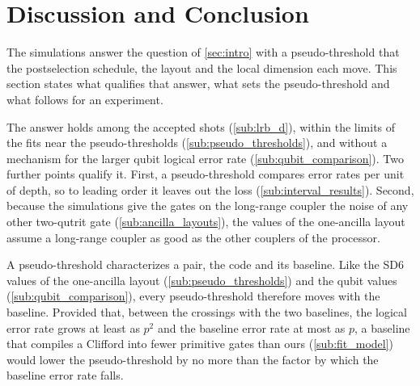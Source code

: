 \section{Discussion and Conclusion}\label{sec:discussion}

The simulations answer the question of \autoref{sec:intro} with a pseudo-threshold that the postselection schedule, the layout and the local dimension each move. This section states what qualifies that answer, what sets the pseudo-threshold and what follows for an experiment.

The answer holds among the accepted shots (\autoref{sub:lrb_d}), within the limits of the fits near the pseudo-thresholds (\autoref{sub:pseudo_thresholds}), and without a mechanism for the larger qubit logical error rate (\autoref{sub:qubit_comparison}). Two further points qualify it. First, a pseudo-threshold compares error rates per unit of depth, so to leading order it leaves out the loss (\autoref{sub:interval_results}). Second, because the simulations give the gates on the long-range coupler the noise of any other two-qutrit gate (\autoref{sub:ancilla_layouts}), the values of the one-ancilla layout assume a long-range coupler as good as the other couplers of the processor.

A pseudo-threshold characterizes a pair, the code and its baseline. Like the SD6 values of the one-ancilla layout (\autoref{sub:pseudo_thresholds}) and the qubit values (\autoref{sub:qubit_comparison}), every pseudo-threshold therefore moves with the baseline. Provided that, between the crossings with the two baselines, the logical error rate grows at least as $p^2$ and the baseline error rate at most as $p$, a baseline that compiles a Clifford into fewer primitive gates than ours (\autoref{sub:fit_model}) would lower the pseudo-threshold by no more than the factor by which the baseline error rate falls.

